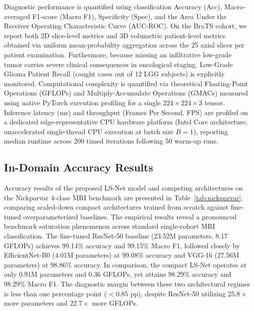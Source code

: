 ﻿\documentclass[journal]{IEEEtran}
\begin{document}
Diagnostic performance is quantified using classification Accuracy (Acc), Macro-averaged F1-score (Macro F1), Specificity (Spec), and the Area Under the Receiver Operating Characteristic Curve (AUC-ROC). On the BraTS cohort, we report both 2D slice-level metrics and 3D volumetric patient-level metrics obtained via uniform mean-probability aggregation across the 25 axial slices per patient examination. Furthermore, because missing an infiltrative low-grade tumor carries severe clinical consequences in oncological staging, Low-Grade Glioma Patient Recall (caught cases out of 12 LGG subjects) is explicitly monitored. Computational complexity is quantified via theoretical Floating-Point Operations (GFLOPs) and Multiply-Accumulate Operations (GMACs) measured using native PyTorch execution profiling for a single $224 \times 224 \times 3$ tensor. Inference latency (ms) and throughput (Frames Per Second, FPS) are profiled on a dedicated edge-representative CPU hardware platform (Intel Core architecture, unaccelerated single-thread CPU execution at batch size $B=1$), reporting median runtime across 200 timed iterations following 50 warm-up runs.

\subsection{In-Domain Accuracy Results}

Accuracy results of the proposed LS-Net model and competing architectures on the Nickparvar 4-class MRI benchmark are presented in Table~\ref{tab:nickparvar}, comparing scaled-down compact architectures trained from scratch against fine-tuned overparameterized baselines. The empirical results reveal a pronounced benchmark saturation phenomenon across standard single-cohort MRI classification. The fine-tuned ResNet-50 baseline (23.52M parameters, 8.17 GFLOPs) achieves 99.14\% accuracy and 99.15\% Macro F1, followed closely by EfficientNet-B0 (4.01M parameters) at 99.08\% accuracy and VGG-16 (27.56M parameters) at 98.86\% accuracy. In comparison, the compact LS-Net operates at only 0.91M parameters and 0.36 GFLOPs, yet attains 98.29\% accuracy and 98.29\% Macro F1. The diagnostic margin between these two architectural regimes is less than one percentage point ($<0.85$ pp), despite ResNet-50 utilizing $25.8\times$ more parameters and $22.7\times$ more GFLOPs.
\end{document}
